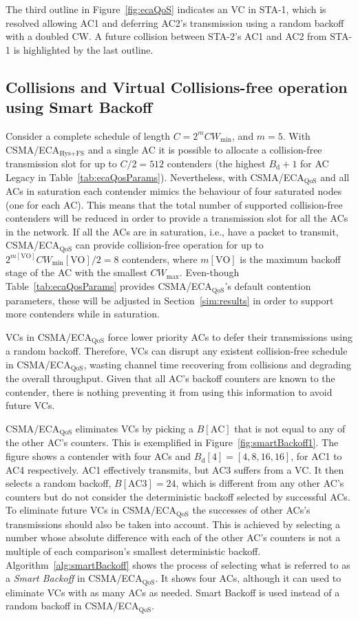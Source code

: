 The third outline in Figure~\ref{fig:ecaQoS} indicates an VC in STA-1, which is resolved allowing AC1 and deferring AC2's transmission using a random backoff with a doubled CW. A future collision between STA-2's AC1 and AC2 from STA-1 is highlighted by the last outline.

\subsection{Collisions and Virtual Collisions-free operation using Smart Backoff}\label{ECAqosCollisionFree}
Consider a complete schedule of length $C=2^{m}CW_{\min}$, and $m=5$. With CSMA/ECA$_{\text{Hys+FS}}$ and a single AC it is possible to allocate a collision-free transmission slot for up to $C/2=512$ contenders (the highest $B_{\text{d}}+1$ for AC Legacy in Table~\ref{tab:ecaQosParams}). Nevertheless, with CSMA/ECA$_{\text{QoS}}$ and all ACs in saturation each contender mimics the behaviour of four saturated nodes (one for each AC). This means that the total number of supported collision-free contenders will be reduced in order to provide a transmission slot for all the ACs in the network. If all the ACs are in saturation, i.e., have a packet to transmit, CSMA/ECA$_{\text{QoS}}$ can provide collision-free operation for up to $2^{m[\text{VO}]}CW_{\min}[\text{VO}]/2=8$ contenders, where $m[\text{VO}]$ is the maximum backoff stage of the AC with the smallest $CW_{\max}$. Even-though Table~\ref{tab:ecaQosParams} provides CSMA/ECA$_{\text{QoS}}$'s default contention parameters, these will be adjusted in Section~\ref{sim:results} in order to support more contenders while in saturation.

VCs in CSMA/ECA$_{\text{QoS}}$ force lower priority ACs to defer their transmissions using a random backoff. Therefore, VCs can disrupt any existent collision-free schedule in CSMA/ECA$_{\text{QoS}}$, wasting channel time recovering from collisions and degrading the overall throughput. Given that all AC's backoff counters are known to the contender, there is nothing preventing it from using this information to avoid future VCs.

CSMA/ECA$_{\text{QoS}}$ eliminates VCs by picking a $B[\text{AC}]$ that is not equal to any of the other AC's counters. This is exemplified in Figure~\ref{fig:smartBackoff1}. The figure shows a contender with four ACs and $B_{\text{d}}[4]=[4,8,16,16]$, for AC1 to AC4 respectively. AC1 effectively transmits, but AC3 suffers from a VC. It then selects a random backoff, $B[\text{AC3}]=24$, which is different from any other AC's counters but do not consider the deterministic backoff selected by successful ACs. To eliminate future VCs in CSMA/ECA$_{\text{QoS}}$ the successes of other ACs's transmissions should also be taken into account. This is achieved by selecting a number whose absolute difference with each of the other AC's counters is not a multiple of each comparison's smallest deterministic backoff. Algorithm~\ref{alg:smartBackoff} shows the process of selecting what is referred to as a \emph{Smart Backoff} in CSMA/ECA$_{\text{QoS}}$. It shows four ACs, although it can used to eliminate VCs with as many ACs as needed. Smart Backoff is used instead of a random backoff in CSMA/ECA$_{\text{QoS}}$.

